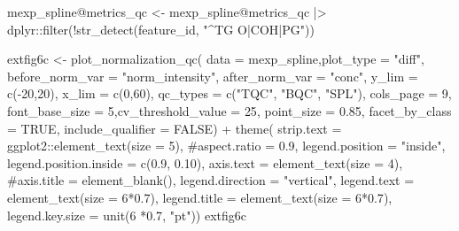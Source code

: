 \documentclass[
  letterpaper,
  DIV=11,
  numbers=noendperiod]{scrartcl}
\newenvironment{Shaded}{\begin{snugshade}}{\end{snugshade}}
\newcommand{\AttributeTok}[1]{\textcolor[rgb]{0.40,0.45,0.13}{#1}}
\newcommand{\CommentTok}[1]{\textcolor[rgb]{0.37,0.37,0.37}{#1}}
\newcommand{\ConstantTok}[1]{\textcolor[rgb]{0.56,0.35,0.01}{#1}}
\newcommand{\DecValTok}[1]{\textcolor[rgb]{0.68,0.00,0.00}{#1}}
\newcommand{\FloatTok}[1]{\textcolor[rgb]{0.68,0.00,0.00}{#1}}
\newcommand{\FunctionTok}[1]{\textcolor[rgb]{0.28,0.35,0.67}{#1}}
\newcommand{\NormalTok}[1]{\textcolor[rgb]{0.00,0.23,0.31}{#1}}
\newcommand{\OtherTok}[1]{\textcolor[rgb]{0.00,0.23,0.31}{#1}}
\newcommand{\SpecialCharTok}[1]{\textcolor[rgb]{0.37,0.37,0.37}{#1}}
\newcommand{\StringTok}[1]{\textcolor[rgb]{0.13,0.47,0.30}{#1}}
\begin{document}
\begin{Shaded}
\begin{Highlighting}[]
\NormalTok{mexp\_spline}\SpecialCharTok{@}\NormalTok{metrics\_qc }\OtherTok{\textless{}{-}}\NormalTok{ mexp\_spline}\SpecialCharTok{@}\NormalTok{metrics\_qc }\SpecialCharTok{|\textgreater{}} 
\NormalTok{  dplyr}\SpecialCharTok{::}\FunctionTok{filter}\NormalTok{(}\SpecialCharTok{!}\FunctionTok{str\_detect}\NormalTok{(feature\_id, }\StringTok{"\^{}TG O|COH|PG"}\NormalTok{))}

\NormalTok{extfig6c }\OtherTok{\textless{}{-}} \FunctionTok{plot\_normalization\_qc}\NormalTok{(}
  \AttributeTok{data =}\NormalTok{ mexp\_spline,}\AttributeTok{plot\_type =} \StringTok{"diff"}\NormalTok{,}
  \AttributeTok{before\_norm\_var =} \StringTok{"norm\_intensity"}\NormalTok{,}
  \AttributeTok{after\_norm\_var =} \StringTok{"conc"}\NormalTok{,}
  \AttributeTok{y\_lim =} \FunctionTok{c}\NormalTok{(}\SpecialCharTok{{-}}\DecValTok{20}\NormalTok{,}\DecValTok{20}\NormalTok{),}
  \AttributeTok{x\_lim =} \FunctionTok{c}\NormalTok{(}\DecValTok{0}\NormalTok{,}\DecValTok{60}\NormalTok{),}
  \AttributeTok{qc\_types =} \FunctionTok{c}\NormalTok{(}\StringTok{"TQC"}\NormalTok{, }\StringTok{"BQC"}\NormalTok{, }\StringTok{"SPL"}\NormalTok{),}
  \AttributeTok{cols\_page =} \DecValTok{9}\NormalTok{,}
  \AttributeTok{font\_base\_size =} \DecValTok{5}\NormalTok{,}\AttributeTok{cv\_threshold\_value =} \DecValTok{25}\NormalTok{,}
  \AttributeTok{point\_size =} \FloatTok{0.85}\NormalTok{,}
  \AttributeTok{facet\_by\_class =} \ConstantTok{TRUE}\NormalTok{,}
  \AttributeTok{include\_qualifier =} \ConstantTok{FALSE}\NormalTok{) }\SpecialCharTok{+} 
    \FunctionTok{theme}\NormalTok{(}
      \AttributeTok{strip.text =}\NormalTok{ ggplot2}\SpecialCharTok{::}\FunctionTok{element\_text}\NormalTok{(}\AttributeTok{size =} \DecValTok{5}\NormalTok{),}
      \CommentTok{\#aspect.ratio = 0.9,}
      \AttributeTok{legend.position =} \StringTok{"inside"}\NormalTok{,}
      \AttributeTok{legend.position.inside =} \FunctionTok{c}\NormalTok{(}\FloatTok{0.9}\NormalTok{, }\FloatTok{0.10}\NormalTok{),}
      \AttributeTok{axis.text =} \FunctionTok{element\_text}\NormalTok{(}\AttributeTok{size =} \DecValTok{4}\NormalTok{),}
      \CommentTok{\#axis.title = element\_blank(),}
      \AttributeTok{legend.direction =} \StringTok{"vertical"}\NormalTok{, }
      \AttributeTok{legend.text =} \FunctionTok{element\_text}\NormalTok{(}\AttributeTok{size =} \DecValTok{6}\SpecialCharTok{*}\FloatTok{0.7}\NormalTok{), }
      \AttributeTok{legend.title =} \FunctionTok{element\_text}\NormalTok{(}\AttributeTok{size =} \DecValTok{6}\SpecialCharTok{*}\FloatTok{0.7}\NormalTok{),}
      \AttributeTok{legend.key.size =} \FunctionTok{unit}\NormalTok{(}\DecValTok{6} \SpecialCharTok{*}\FloatTok{0.7}\NormalTok{, }\StringTok{"pt"}\NormalTok{))}
\NormalTok{extfig6c}
\end{Highlighting}
\end{Shaded}
\end{document}
